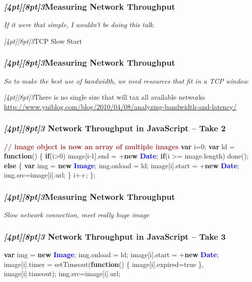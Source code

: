 \documentclass{beamer}
\newcommand{\sn}[1]{\textrm{\textit{\Huge{\raisebox{-3pt}[4pt][8pt]{\textcolor{f2elblue}{#1}}}}}\hspace{4pt}}
\newcommand{\innersplash}[1]{
  \begin{center}
    \large \textrm{\textit{ #1 } }
  \end{center}
}
\newcommand{\splashslide}[2][{}]{
  \begin{frame}
  \frametitle{#1}
  \innersplash{#2}
  \end{frame}
}
\def\brown<#1>#2{\textcolor<#1>{brown}{\textbf<#1>{#2}}}
\def\green<#1>#2{\textcolor<#1>{dark-green}{\textbf<#1>{#2}}}
\def\blue<#1>#2{\textcolor<#1>{blue}{\textbf<#1>{#2}}}
\begin{document}
\splashslide[\sn{3}Measuring Network Throughput]{If it were that simple, I wouldn't be doing this talk.}

\begin{frame}{\sn{3}TCP Slow Start}
\end{frame}

\splashslide[\sn{3}Measuring Network Throughput]{So to make the best use of bandwidth, we need resources that fit in a TCP window}

\begin{frame}{\sn{3}There is no single size that will tax all available networks }
\vspace{6cm}
\tiny \href{http://www.yuiblog.com/blog/2010/04/08/analyzing-bandwidth-and-latency/}{http://www.yuiblog.com/blog/2010/04/08/analyzing-bandwidth-and-latency/}
\end{frame}

\begin{frame}[fragile]
\frametitle{\sn{3} Network Throughput in JavaScript -- Take 2}
\begin{semiverbatim}
\brown<1>{// image object is now an array of multiple images}
\green<1>{var} i=0;
\green<1>{var} ld = \green<1>{function}() \{
   \green<1>{if}(i>0)
      image[i-1].end = +\green<1>{new} \blue<1>{Date};
   \green<1>{if}(i >= image.length)
      done();
   \green<1>{else} \{
      \green<1>{var} img = \green<1>{new} \blue<1>{Image};
      img.onload = ld;
      image[i].start = +\green<1>{new} \blue<1>{Date};
      img.src=image[i].url;
   \}
   i++;
\};
\end{semiverbatim}
\end{frame}

\splashslide[\sn{3}Measuring Network Throughput]{Slow network connection, meet really huge image}

\begin{frame}[fragile]
\frametitle{\sn{3} Network Throughput in JavaScript -- Take 3}
\begin{semiverbatim}
   \green<1>{var} img = \green<1>{new} \blue<1>{Image};
   img.onload = ld;
   image[i].start = +\green<1>{new} \blue<1>{Date};
   image[i].timer =
         setTimeout(\green<1>{function}() \{
                       image[i].expired=true
                    \},
                    image[i].timeout);
   img.src=image[i].url;
\end{semiverbatim}
\end{frame}
\end{document}
